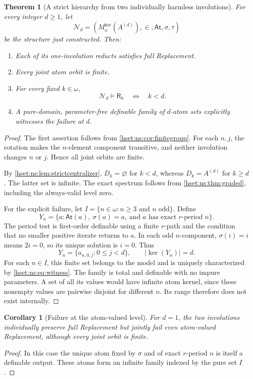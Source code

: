 \documentclass[11pt,letterpaper]{article}
\newtheorem{theorem}{Theorem}[section]
\newtheorem{corollary}[corollary]{Corollary}\aliascntresetthe{corollary}
\theoremstyle{definition}
\theoremstyle{remark}
\newcommand{\kerat}{\operatorname{ker}}
\newcommand{\Mker}{M^{\mathrm{ker}}}
\newcommand{\At}{\mathsf{At}}
\newcommand{\abs}[1]{\lvert #1\rvert}
\begin{document}
\begin{theorem}[A strict hierarchy from two individually harmless involutions]\label{hset:ns:thm:strict}
For every integer $d\ge1$, let
\[
 \mathcal N_d=(\Mker_\omega(A^{(d)}),\in,\At,\sigma,\tau)
\]
be the structure just constructed. Then:
\begin{enumerate}
\item Each of its one-involution reducts satisfies full Replacement.
\item Every joint atom orbit is finite.
\item For every fixed $k\in\omega$,
\[
 \mathcal N_d\models\mathsf R_k\quad\Longleftrightarrow\quad k<d.
\]
\item A pure-domain, parameter-free definable family of $d$-atom sets explicitly witnesses the failure at $d$.
\end{enumerate}
\end{theorem}
\begin{proof}
The first assertion follows from \cref{hset:ns:cor:finitegroup}. For each $n,j$, the rotation makes the $n$-element component transitive, and neither involution changes $n$ or $j$. Hence all joint orbits are finite.

By \cref{hset:ns:lem:strictcentralizer}, $D_k=\varnothing$ for $k<d$, whereas $D_k=A^{(d)}$ for $k\ge d$. The latter set is infinite. The exact spectrum follows from \cref{hset:ns:thm:graded}, including the always-valid level zero.

For the explicit failure, let $I=\{n\in\omega:n\ge3\text{ and }n\text{ odd}\}$. Define
\begin{equation}\label{hset:ns:eq:witness}
 Y_n=\{a:\At(a),\ \sigma(a)=a,\ \text{and $a$ has exact $r$-period }n\}.
\end{equation}
The period test is first-order definable using a finite $r$-path and the condition that no smaller positive iterate returns to $a$. In each odd $n$-component, $\sigma(i)=i$ means $2i=0$, so its unique solution is $i=0$. Thus
\[
 Y_n=\{a_{n,0,j}:0\le j<d\},\qquad \abs{\kerat(Y_n)}=d.
\]
For each $n\in I$, this finite set belongs to the model and is uniquely characterized by \eqref{hset:ns:eq:witness}. The family is total and definable with no impure parameters. A set of all its values would have infinite atom kernel, since these nonempty values are pairwise disjoint for different $n$. Its range therefore does not exist internally.
\end{proof}

\begin{corollary}[Failure at the atom-valued level]\label{hset:ns:cor:atomfailure}
For $d=1$, the two involutions individually preserve full Replacement but jointly fail even atom-valued Replacement, although every joint orbit is finite.
\end{corollary}
\begin{proof}
In this case the unique atom fixed by $\sigma$ and of exact $r$-period $n$ is itself a definable output. These atoms form an infinite family indexed by the pure set $I$.
\end{proof}
\end{document}
